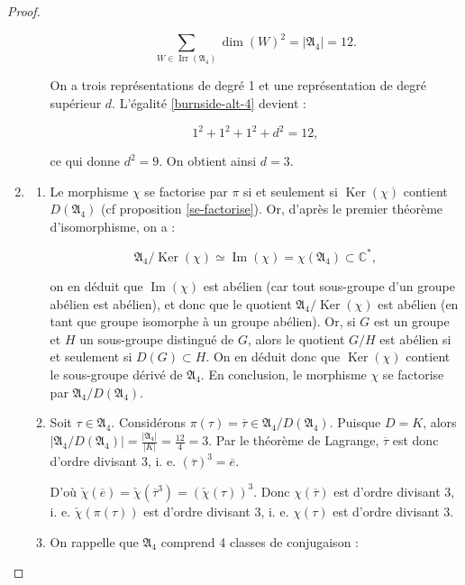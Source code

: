 \documentclass[french]{book}
\theoremstyle{definition}
\theoremstyle{remark}
\begin{document}
\begin{proof}
\begin{enumerate}
\begin{enumerate}
      \begin{equation}\label{burnside-alt-4}
        \sum_{W \in \operatorname{Irr}(\mathfrak{A}_4)} \operatorname{dim}(W)^2 = \left\lvert \mathfrak{A}_4 \right\rvert = 12.
      \end{equation}

      On a trois représentations de degré 1 et une représentation de degré supérieur \(d\). L'égalité \ref{burnside-alt-4} devient :

      \[1 ^2 + 1 ^2 + 1 ^2 + d ^2 = 12,\]

      ce qui donne \(d ^2 = 9\). On obtient ainsi \(d=3\).
    \end{enumerate}
    \item \begin{enumerate}
      \item Le morphisme \(\chi\) se factorise par \(\pi\) si et seulement si \(\operatorname{Ker}(\chi)\) contient \(D(\mathfrak{A}_4)\) (cf proposition \ref{se-factorise}). Or, d'après le premier théorème d'isomorphisme, on a :

      \[\mathfrak{A}_{4} / \operatorname{Ker}(\chi) \simeq \operatorname{Im}(\chi) = \chi(\mathfrak{A}_{4}) \subset \mathbb{C}^{*},\]

      on en déduit que \(\operatorname{Im}(\chi)\) est abélien (car tout sous-groupe d'un groupe abélien est abélien), et donc que le quotient \(\mathfrak{A}_{4} / \operatorname{Ker}(\chi)\) est abélien (en tant que groupe isomorphe à un groupe abélien).
      Or, si \(G\) est un groupe et \(H\) un sous-groupe distingué de \(G\), alors le quotient \(G / H\) est abélien si et seulement si \(D(G)\subset H\). On en déduit donc que \(\operatorname{Ker}(\chi)\) contient le sous-groupe dérivé de \(\mathfrak{A}_{4}\). En conclusion, le morphisme \(\chi\) se factorise par \(\mathfrak{A}_{4} / D(\mathfrak{A}_{4})\).
      \item Soit \(\tau \in \mathfrak{A}_{4}\). Considérons \(\pi(\tau) = \overline{\tau} \in \mathfrak{A}_{4}/D(\mathfrak{A}_{4})\). Puisque \(D=K\), alors \(\left\lvert \mathfrak{A}_{4}/ D(\mathfrak{A}_{4}) \right\rvert = \frac{\left\lvert \mathfrak{A}_{4} \right\rvert}{\left\lvert K \right\rvert} = \frac{12}{4}=3\).
      Par le théorème de Lagrange, \(\overline{\tau}\) est donc d'ordre divisant 3, i. e. \((\overline{\tau})^3 = \overline{e}\).

      D'où \(\check{\chi}(\overline{e}) = \check{\chi}(\overline{\tau}^{3}) = (\check{\chi}(\tau))^3\). Donc \(\chi(\overline{\tau})\) est d'ordre divisant 3, i. e. \(\check{\chi}(\pi(\tau))\) est d'ordre divisant 3, i. e. \(\chi(\tau)\) est d'ordre divisant 3.
      \item On rappelle que \(\mathfrak{A}_{4}\) comprend 4 classes de conjugaison :


\end{enumerate}
\end{enumerate}
\end{proof}
\end{document}
